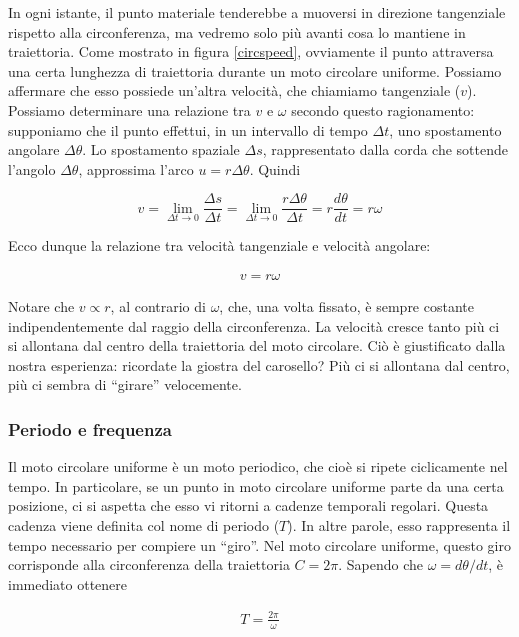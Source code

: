 In ogni istante, il punto materiale tenderebbe a muoversi in direzione
tangenziale rispetto alla circonferenza, ma vedremo solo più avanti
cosa lo mantiene in traiettoria. Come mostrato in figura \ref{circspeed},
ovviamente il punto attraversa
una certa lunghezza di traiettoria durante un moto circolare uniforme.
Possiamo affermare che esso possiede un'altra velocità, che chiamiamo
tangenziale ($v$). Possiamo determinare una relazione tra $v$ e $\omega$
secondo questo ragionamento: supponiamo che il punto effettui, in
un intervallo di tempo $\Delta t$, uno spostamento angolare $\Delta \theta$.
Lo spostamento spaziale $\Delta s$, rappresentato dalla corda che
sottende l'angolo $\Delta \theta$, approssima l'arco $u = r\Delta \theta$.
Quindi

\[ v = \lim_{\Delta t \to 0}\frac{\Delta s}{\Delta t} = \lim_{\Delta t \to 0}\frac{r \Delta\theta}{\Delta t} = r\frac{d\theta}{dt} = r\omega \]

\noindent Ecco dunque la relazione tra velocità tangenziale e velocità
angolare:

\begin{align}
    v = r \omega
\end{align}

\noindent Notare che $v \propto r$, al contrario di $\omega$, che, una volta
fissato, è sempre costante indipendentemente dal raggio della circonferenza.
La velocità cresce tanto più ci si allontana dal centro della traiettoria
del moto circolare. Ciò è giustificato dalla nostra esperienza: ricordate
la giostra del carosello? Più ci si allontana dal centro, più ci sembra di
``girare'' velocemente.

\subsubsection*{Periodo e frequenza}
Il moto circolare uniforme è un moto periodico, che cioè si ripete
ciclicamente nel tempo. In particolare, se un punto in moto circolare
uniforme parte da una certa posizione, ci si aspetta che esso vi ritorni
a cadenze temporali regolari. Questa cadenza viene definita col nome di periodo
($T$). In altre parole, esso rappresenta il tempo necessario per compiere
un ``giro''. Nel moto circolare uniforme, questo giro corrisponde alla
circonferenza della traiettoria $C = 2\pi$. Sapendo che $\omega = d\theta/dt$,
è immediato ottenere

\begin{align}
    T = \frac{2\pi}{\omega}
\end{align}

